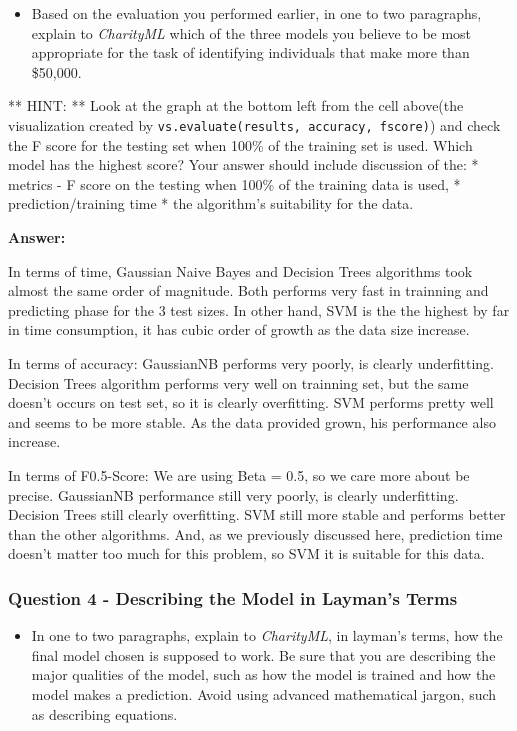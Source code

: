 \documentclass[11pt]{article}
\providecommand{\tightlist}{%
      \setlength{\itemsep}{0pt}\setlength{\parskip}{0pt}}
\begin{document}
\begin{itemize}
\tightlist
\item
  Based on the evaluation you performed earlier, in one to two
  paragraphs, explain to \emph{CharityML} which of the three models you
  believe to be most appropriate for the task of identifying individuals
  that make more than \$50,000.
\end{itemize}

** HINT: ** Look at the graph at the bottom left from the cell above(the
visualization created by
\texttt{vs.evaluate(results,\ accuracy,\ fscore)}) and check the F score
for the testing set when 100\% of the training set is used. Which model
has the highest score? Your answer should include discussion of the: *
metrics - F score on the testing when 100\% of the training data is
used, * prediction/training time * the algorithm's suitability for the
data.

    \textbf{Answer: }

In terms of time, Gaussian Naive Bayes and Decision Trees algorithms
took almost the same order of magnitude. Both performs very fast in
trainning and predicting phase for the 3 test sizes. In other hand, SVM
is the the highest by far in time consumption, it has cubic order of
growth as the data size increase.

In terms of accuracy: GaussianNB performs very poorly, is clearly
underfitting. Decision Trees algorithm performs very well on trainning
set, but the same doesn't occurs on test set, so it is clearly
overfitting. SVM performs pretty well and seems to be more stable. As
the data provided grown, his performance also increase.

In terms of F0.5-Score: We are using Beta = 0.5, so we care more about
be precise. GaussianNB performance still very poorly, is clearly
underfitting. Decision Trees still clearly overfitting. SVM still more
stable and performs better than the other algorithms. And, as we
previously discussed here, prediction time doesn't matter too much for
this problem, so SVM it is suitable for this data.

    \subsubsection{Question 4 - Describing the Model in Layman's
Terms}\label{question-4---describing-the-model-in-laymans-terms}

\begin{itemize}
\tightlist
\item
  In one to two paragraphs, explain to \emph{CharityML}, in layman's
  terms, how the final model chosen is supposed to work. Be sure that
  you are describing the major qualities of the model, such as how the
  model is trained and how the model makes a prediction. Avoid using
  advanced mathematical jargon, such as describing equations.
\end{itemize}
\end{document}
